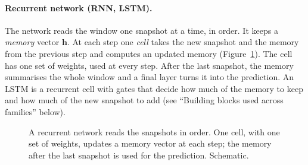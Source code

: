 \paragraph{Recurrent network (RNN, LSTM).} The network reads the window one snapshot at a time, in order. It keeps a
\emph{memory} vector $\mathbf{h}$. At each step one \emph{cell} takes the new snapshot and the memory from the
previous step and computes an updated memory (Figure~\ref{fig:fam-rnn}). The cell has one set of weights, used at
every step. After the last snapshot, the memory summarises the whole window and a final layer turns it into the
prediction. An LSTM is a recurrent cell with gates that decide how much of the memory to keep and how much of the
new snapshot to add (see ``Building blocks used across families'' below).

\begin{figure}[!htbp]
\centering
{}
\caption{A recurrent network reads the snapshots in order. One cell, with one set of weights, updates a memory
vector at each step; the memory after the last snapshot is used for the prediction. Schematic.}
\label{fig:fam-rnn}
\end{figure}

